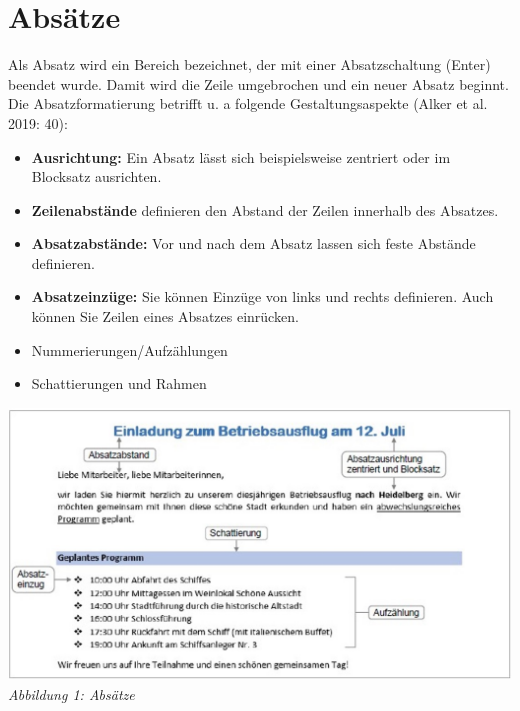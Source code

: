 \documentclass[a4paper, 11pt]{scrartcl}
\begin{document}
	\section{Absätze} %
	\begin{justify}
		Als Absatz wird ein Bereich bezeichnet, der mit einer Absatzschaltung (Enter) beendet wurde. Damit wird die Zeile umgebrochen und ein neuer Absatz beginnt. Die Absatzformatierung betrifft u. a folgende Gestaltungsaspekte (Alker et al. 2019: 40):
		\begin{itemize}
			\setlength\itemsep{0.001em}
			\item \textbf{Ausrichtung:} Ein Absatz lässt sich beispielsweise zentriert oder im Blocksatz ausrichten.
			\item \textbf{Zeilenabstände} definieren den Abstand der Zeilen innerhalb des Absatzes.
			\item \textbf{Absatzabstände:} Vor und nach dem Absatz lassen sich feste Abstände definieren.
			\item \textbf{Absatzeinzüge:} Sie können Einzüge von links und rechts definieren. Auch können Sie Zeilen eines Absatzes einrücken.
			\item Nummerierungen/Aufzählungen
			\item Schattierungen und Rahmen
		\end{itemize}
		\includegraphics[width=13.44cm, height=7.2cm]{Abbildung01}\\
		{\normalfont\scriptsize\color{grey-blue}\textit{Abbildung 1: Absätze}}
	\end{justify}
\end{document}
